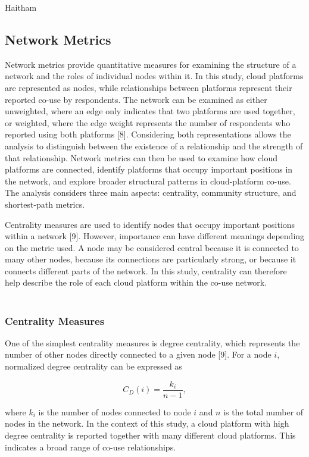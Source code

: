 \documentclass{article}
\begin{document}
\begin{itemize}
{{\color{black}
Haitham
\subsection{Network Metrics}

{\color{mygreen} 
Network metrics provide quantitative measures for examining the structure of a network and the roles of individual nodes within it. In this study, cloud platforms are represented as nodes, while relationships between platforms represent their reported co-use by respondents. The network can be examined as either unweighted, where an edge only indicates that two platforms are used together, or weighted, where the edge weight represents the number of respondents who reported using both platforms [8]. Considering both representations allows the analysis to distinguish between the existence of a relationship and the strength of that relationship. Network metrics can then be used to examine how cloud platforms are connected, identify platforms that occupy important positions in the network, and explore broader structural patterns in cloud-platform co-use. The analysis considers three main aspects: centrality, community structure, and shortest-path metrics.

Centrality measures are used to identify nodes that occupy important positions within a network [9]. However, importance can have different meanings depending on the metric used. A node may be considered central because it is connected to many other nodes, because its connections are particularly strong, or because it connects different parts of the network. In this study, centrality can therefore help describe the role of each cloud platform within the co-use network.
\\\\
\subsubsection{Centrality Measures}

One of the simplest centrality measures is degree centrality, which represents the number of other nodes directly connected to a given node [9]. For a node $i$, normalized degree centrality can be expressed as

\[
C_D(i) = \frac{k_i}{n-1},
\]

where $k_i$ is the number of nodes connected to node $i$ and $n$ is the total number of nodes in the network. In the context of this study, a cloud platform with high degree centrality is reported together with many different cloud platforms. This indicates a broad range of co-use relationships.

}}}
\end{itemize}
\end{document}
